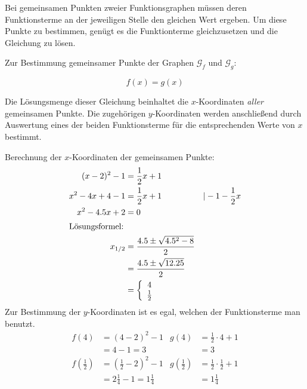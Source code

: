 \begin{regel}
 Bei gemeinsamen Punkten zweier Funktionsgraphen müssen deren Funktionsterme an der jeweiligen Stelle den gleichen Wert ergeben. Um diese Punkte zu bestimmen, genügt es die Funktionterme gleichzusetzen und die Gleichung zu lösen.
 
 Zur Bestimmung gemeinsamer Punkte der Graphen \(\mathcal{G}_f\) und \(\mathcal{G}_g\):
 \begin{blockwhitebox}
  \begin{equation*}
   f(x) = g(x)
  \end{equation*}
 \end{blockwhitebox}
 Die Lösungsmenge dieser Gleichung beinhaltet die \(x\)-Koordinaten \emph{aller} gemeinsamen Punkte. Die zugehörigen \(y\)-Koordinaten werden anschließend durch Auswertung eines der beiden Funktionsterme für die entsprechenden Werte von \(x\) bestimmt.
\end{regel}

\begin{bsp}
Berechnung der \(x\)-Koordinaten der gemeinsamen Punkte:
 \begin{align*}
  (x-2)^2 -1 &= \frac{1}{2}x+1 && \\
  x^2-4x+4-1 &= \frac{1}{2}x+1 &&| -1-\frac{1}{2}x\\
  x^2-4.5x+2 &= 0 \\\intertext{Lösungsformel:}
  x_{1/2} &= \frac{4.5\pm \sqrt{4.5^2-8}}{2} \\
  &= \frac{4.5\pm\sqrt{12.25}}{2} \\
  & = \left\lbrace\begin{array}{c}
                                                 4 \\ \frac{1}{2}
                                                \end{array}\right.
 \end{align*}
 Zur Bestimmung der \(y\)-Koordinaten ist es egal, welchen der Funktionsterme man benutzt.
 \begin{align*}
  f(4)&=(4-2)^2-1 & g(4) &= \frac{1}{2}\cdot 4+1\\
      &=4-1=3 & &=3\\
  f\left(\frac{1}{2}\right) &= \left(\frac{1}{2}-2\right)^2-1 & g\left(\frac{1}{2}\right) &= \frac{1}{2}\cdot\frac{1}{2}+1\\
  &= 2\frac{1}{4} -1 = 1\frac{1}{4}& &= 1\frac{1}{4} 
 \end{align*}

\end{bsp}


